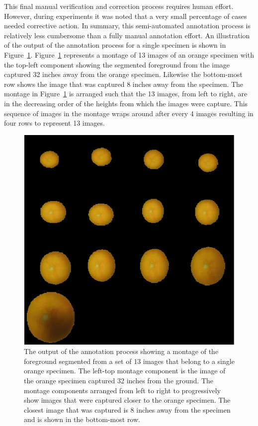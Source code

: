 \documentclass {udthesis}
\begin{document}
This final manual verification and correction process requires human effort. However, during experiments it was noted that a very small percentage of cases needed corrective action. In summary, this semi-automated annotation process is relatively less cumbersome than a fully manual annotation effort. An illustration of the output of the annotation process for a single specimen is shown in Figure~\ref{fig:orange_segment_height_montage}. Figure~\ref{fig:orange_segment_height_montage} represents a montage of 13 images of an orange specimen with the top-left component showing the segmented foreground from the image captured 32 inches away from the orange specimen. Likewise the bottom-most row shows the image that was captured 8 inches away from the specimen. The montage in Figure~\ref{fig:orange_segment_height_montage} is arranged such that the 13 images, from left to right, are in the decreasing order of the heights from which the images were capture. This sequence of images in the montage wraps around after every 4 images resulting in four rows to represent 13 images.
%
\begin{figure}
  \centering
  \includegraphics[width=\textwidth]{orange_height_segment_montage}
  \caption[Annotation output for a single specimen]{The output of the annotation process showing a montage of the foreground segmented from a set of 13 images that belong to a single orange specimen. The left-top montage component is the image of the orange specimen captured 32 inches from the ground. The montage components arranged from left to right to progressively show images that were captured closer to the orange specimen. The closest image that was captured is 8 inches away from the specimen and is shown in the bottom-most row.} 
  \label{fig:orange_segment_height_montage}
\end{figure}	
%
\end{document}
